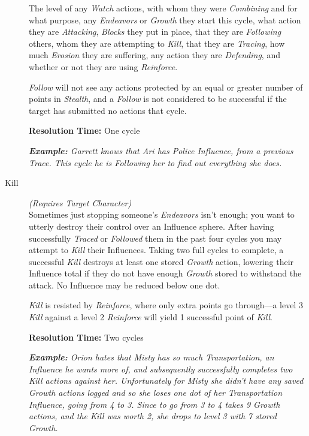 \begin{description}
		The level of any \emph{Watch} actions, with whom they were \emph{Combining} and for what purpose, any 
		\emph{Endeavors} or \emph{Growth} they start this cycle, what action they are \emph{Attacking}, 
		\emph{Blocks} they put in place, that they are \emph{Following} others, whom they are attempting to \emph{Kill}, 
		that they are \emph{Tracing}, how much \emph{Erosion} they are suffering, any action they are \emph{Defending}, 
		and whether or not they are using \emph{Reinforce}.
		
		\emph{Follow} will not see any actions protected by an equal or greater number of points in \emph{Stealth}, and 
		a \emph{Follow} is not considered to be successful if the target has submitted no actions that cycle.
		
		\textbf{Resolution Time:} One cycle
		
		\emph{\textbf{Example:} Garrett knows that Ari has Police Influence, from a previous \emph{Trace}.
		This cycle he is \emph{Following} her to find out everything she does.} \\
	
	\item[Kill] \emph{(Requires Target Character)} \hfill \\
		Sometimes just stopping someone's \emph{Endeavors} isn't enough; you want to utterly destroy their 
		control over an Influence sphere.  After having successfully \emph{Traced} or \emph{Followed} them in 
		the past four cycles you may attempt to \emph{Kill} their Influences.  Taking two full cycles to 
		complete, a successful \emph{Kill} destroys at least one stored \emph{Growth} action, lowering their 
		Influence total if they do not have enough \emph{Growth} stored to withstand the attack.  No Influence 
		may be reduced below one dot.
		
		\emph{Kill} is resisted by \emph{Reinforce}, where only extra points go through---a level 3 \emph{Kill} 
		against a level 2 \emph{Reinforce} will yield 1 successful point of \emph{Kill}.
		
		\textbf{Resolution Time:} Two cycles
		
		\emph{\textbf{Example:} Orion hates that Misty has so much \emph{Transportation}, an Influence 
		he wants more of, and subsequently successfully completes two \emph{Kill} actions against her. 
		Unfortunately for Misty she didn't have any saved \emph{Growth} actions logged and so she loses 
		one dot of her \emph{Transportation} Influence, going from 4 to 3. Since to go from 3 to 4 takes 
		9 \emph{Growth} actions, and the \emph{Kill} was worth 2, she drops to level 3 with 7 stored 
		\emph{Growth}.} \\
	

\end{description}
